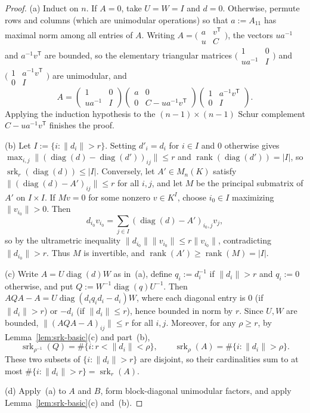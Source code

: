 \documentclass[11pt]{article}
\theoremstyle{definition}
\theoremstyle{remark}
\numberwithin{equation}{section}
\DeclareMathOperator{\srk}{srk}
\DeclareMathOperator{\rank}{rank}
\DeclareMathOperator{\diag}{diag}
\newcommand{\1}{\mathbf{1}}
\begin{document}
\begin{proof}
(a) Induct on $n$. If $A = 0$, take $U = W = I$ and $d = 0$. Otherwise, permute rows and columns (which are unimodular operations) so that $a := A_{11}$ has maximal norm among all entries of $A$. Writing $A = \bigl(\begin{smallmatrix} a & v^\mathsf{T} \\ u & C \end{smallmatrix}\bigr)$, the vectors $u a^{-1}$ and $a^{-1} v^\mathsf{T}$ are bounded, so the elementary triangular matrices $\bigl(\begin{smallmatrix} 1 & 0 \\ u a^{-1} & I \end{smallmatrix}\bigr)$ and $\bigl(\begin{smallmatrix} 1 & a^{-1} v^\mathsf{T} \\ 0 & I \end{smallmatrix}\bigr)$ are unimodular, and
\[
A = \begin{pmatrix} 1 & 0 \\ u a^{-1} & I \end{pmatrix}
\begin{pmatrix} a & 0 \\ 0 & C - u a^{-1} v^\mathsf{T} \end{pmatrix}
\begin{pmatrix} 1 & a^{-1} v^\mathsf{T} \\ 0 & I \end{pmatrix}.
\]
Applying the induction hypothesis to the $(n-1) \times (n-1)$ Schur complement $C - u a^{-1} v^\mathsf{T}$ finishes the proof.

(b) Let $I := \{i : \|d_i\| > r\}$. Setting $d'_i = d_i$ for $i \in I$ and $0$ otherwise gives $\max_{i,j}\|(\diag(d) - \diag(d'))_{ij}\| \le r$ and $\rank(\diag(d')) = |I|$, so $\srk_r(\diag(d)) \le |I|$. Conversely, let $A' \in M_n(K)$ satisfy $\|(\diag(d) - A')_{ij}\| \le r$ for all $i, j$, and let $M$ be the principal submatrix of $A'$ on $I \times I$. If $Mv = 0$ for some nonzero $v \in K^I$, choose $i_0 \in I$ maximizing $\|v_{i_0}\| > 0$. Then
\[
d_{i_0} v_{i_0} = \sum_{j \in I} (\diag(d) - A')_{i_0, j} v_j,
\]
so by the ultrametric inequality $\|d_{i_0}\|\|v_{i_0}\| \le r\|v_{i_0}\|$, contradicting $\|d_{i_0}\| > r$. Thus $M$ is invertible, and $\rank(A') \ge \rank(M) = |I|$.

(c) Write $A = U \diag(d) W$ as in~(a), define $q_i := d_i^{-1}$ if $\|d_i\| > r$ and $q_i := 0$ otherwise, and put $Q := W^{-1} \diag(q) U^{-1}$. Then $AQA - A = U \diag(d_i q_i d_i - d_i) W$, where each diagonal entry is $0$ (if $\|d_i\| > r$) or $-d_i$ (if $\|d_i\| \le r$), hence bounded in norm by $r$. Since $U, W$ are bounded, $\|(AQA - A)_{ij}\| \le r$ for all $i, j$. Moreover, for any $\rho \ge r$, by Lemma~\ref{lem:srk-basic}(c) and part~(b),
\[
\srk_{\rho^{-1}}(Q) = \#\{i : r < \|d_i\| < \rho\}, \qquad \srk_\rho(A) = \#\{i : \|d_i\| > \rho\}.
\]
These two subsets of $\{i : \|d_i\| > r\}$ are disjoint, so their cardinalities sum to at most $\#\{i : \|d_i\| > r\} = \srk_r(A)$.

(d) Apply~(a) to $A$ and $B$, form block-diagonal unimodular factors, and apply Lemma~\ref{lem:srk-basic}(c) and~(b).
\end{proof}
\end{document}

